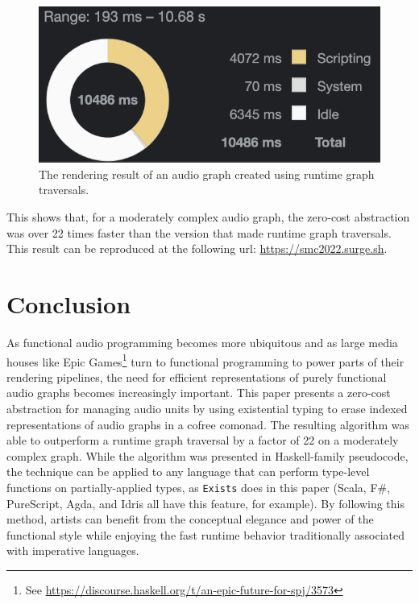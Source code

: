 \documentclass{article}
\begin{document}
\begin{figure}[t]
\centering
\includegraphics[width=0.6\columnwidth]{slow}
\caption{The rendering result of an audio graph created using runtime graph traversals.\label{fig:second_version_rendering}}
\end{figure}

This shows that, for a moderately complex audio graph, the zero-cost abstraction was over 22 times faster than the version that made runtime graph traversals. This result can be reproduced at the following url: \url{https://smc2022.surge.sh}.

\section{Conclusion}

As functional audio programming becomes more ubiquitous and as large media houses like Epic Games\footnote{See \url{https://discourse.haskell.org/t/an-epic-future-for-spj/3573}} turn to functional programming to power parts of their rendering pipelines, the need for efficient representations of purely functional audio graphs becomes increasingly important. This paper presents a zero-cost abstraction for managing audio units by using existential typing to erase indexed representations of audio graphs in a cofree comonad. The resulting algorithm was able to outperform a runtime graph traversal by a factor of 22 on a moderately complex graph. While the algorithm was presented in Haskell-family pseudocode, the technique can be applied to any language that can perform type-level functions on partially-applied types, as \texttt{Exists} does in this paper (Scala, F\#, PureScript, Agda, and Idris all have this feature, for example). By following this method, artists can benefit from the conceptual elegance and power of the functional style while enjoying the fast runtime behavior traditionally associated with imperative languages.

\label{sec:conclusion}



\end{document}

